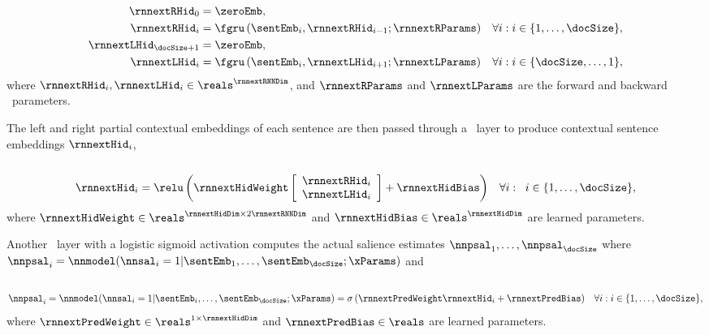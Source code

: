 \noindent{}\\[-40pt]
\begin{align}
    \rnnextRHid_0 & = \zeroEmb,\\ 
 \rnnextRHid_i &= \fgru\left(\sentEmb_i, \rnnextRHid_{i-1}; \rnnextRParams\right) &
    \forall i : i \in \{1,\ldots,\docSize\}, \\
  \rnnextLHid_{\docSize+1} & = \zeroEmb, \\
 \rnnextLHid_i &= \fgru\left(\sentEmb_i, \rnnextLHid_{i+1};\rnnextLParams\right) &
    \forall i : i \in \{\docSize, \ldots, 1\}, 
\end{align}
where $\rnnextRHid_i,\rnnextLHid_i \in \reals^{\rnnextRNNDim}$,
and $\rnnextRParams$ and $\rnnextLParams$ are the forward and backward
\gru~parameters.

The left and right partial contextual embeddings of each sentence 
are then passed through a \feedforward~layer to produce contextual
sentence embeddings $\rnnextHid_i$,\\

\noindent{}\\[-35pt]
\begin{align}
   \rnnextHid_i &= \relu\left(
    \rnnextHidWeight
    \left[ \begin{array}{c} 
        \rnnextRHid_i \\
        \rnnextLHid_i \end{array}\right] + \rnnextHidBias \right)
    & \forall i :\;\; i \in \{1,\ldots,\docSize\},
\end{align}
where $\rnnextHidWeight \in \reals^{\rnnextHidDim \times 2 \rnnextRNNDim}$
and $\rnnextHidBias \in \reals^{\rnnextHidDim}$ are learned parameters.

Another \feedforward~layer with a logistic sigmoid activation computes the
actual salience estimates $\nnpsal_1,\ldots,\nnpsal_\docSize$ where $\nnpsal_i
= \nnmodel(\nnsal_i=1|\sentEmb_1,\ldots,\sentEmb_\docSize;\xParams)$ and \\

\noindent{}\\[-40pt]
\begin{align}
    \nnpsal_i &= \nnmodel(\nnsal_i=1|\sentEmb_i,\ldots,\sentEmb_\docSize; \xParams) = \sigma\left(\rnnextPredWeight\rnnextHid_i + \rnnextPredBias  \right) &
    \forall i :  i \in \{1,\ldots,\docSize\},
\end{align}
where $\rnnextPredWeight \in \reals^{1 \times \rnnextHidDim}$
and $\rnnextPredBias \in \reals$ are learned parameters.

